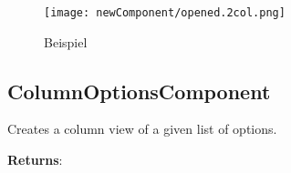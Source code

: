 \begin{figure}[!htb]
    \centering
    \texttt{[image: newComponent/opened.2col.png]}
    \caption*{\centering Beispiel }
    \label{api:selectComponentTvImg}
\end{figure}


\clearpage
\subsection*{ColumnOptionsComponent}

\vspace*{6pt}
Creates a column view of a given list of options. 

\vspace*{18pt}
\noindent
\textbf{Returns}: 

